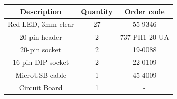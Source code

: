 \begin{tabular}{ccc}
\textbf{Description} & \textbf{Quantity} & \textbf{Order code} \\ \hline
Red LED, 3mm clear   & 27                & 55-9346             \\ \hline
20-pin header        & 2                 & 737-PH1-20-UA       \\ \hline
20-pin socket        & 2                 & 19-0088             \\ \hline
16-pin DIP socket    & 2                 & 22-0109             \\ \hline
MicroUSB cable       & 1                 & 45-4009             \\ \hline
Circuit Board        & 1                 & -                   \\ \hline
\end{tabular}

